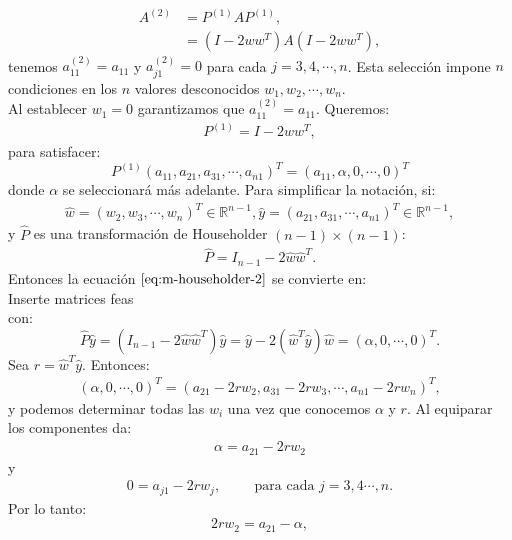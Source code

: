 \begin{align*}
  A^{(2)}&=P^{(1)}AP^{(1)},\\
  &=(I-2ww^T)A(I-2ww^T),
\end{align*}
tenemos $a_{11}^{(2)}=a_{11}$ y $a_{j1}^{(2)}=0$ para cada $j=3,4,\cdots,n$. Esta selección impone $n$ condiciones en los $n$ valores desconocidos $w_1,w_2,\cdots,w_n$.\\
Al establecer $w_1=0$ garantizamos que $a_{11}^{(2)}=a_{11}$. Queremos:
\begin{align*}
  P^{(1)}=I-2ww^T,
\end{align*}
para satisfacer:
\begin{equation}\label{eq:m-householder-2}
  P^{(1)}(a_{11},a_{21},a_{31},\cdots,a_{n1})^{T}=(a_{11},\alpha,0,\cdots,0)^T
\end{equation}
donde $\alpha$ se seleccionará más adelante. Para simplificar la notación, si:
\begin{align*}
  \hat{w}=(w_2,w_3,\cdots,w_n)^{T}\in\mathbb{R}^{n-1}, \hat{y}=(a_{21},a_{31},\cdots,a_{n1})^{T}\in\mathbb{R}^{n-1},  
\end{align*}
y $\hat{P}$ es una transformación de Householder $(n-1)\times(n-1)$:
\begin{align*}
  \hat{P}=I_{n-1}-2\hat{w}\hat{w}^T.
\end{align*}
Entonces la ecuación $\ref{eq:m-householder-2}$ se convierte en:\\
Inserte matrices feas\\ 
con:
\begin{equation}\label{eq:m-householder-9.10}
  \hat{P}\hat{y}=(I_{n-1}-2\hat{w}\hat{w}^T)\hat{y}=\hat{y}-2(\hat{w}^T\hat{y})\hat{w}=(\alpha,0,\cdots,0)^T.
\end{equation}
Sea $r=\hat{w}^T\hat{y}$. Entonces:
\begin{align*}
  (\alpha,0,\cdots,0)^{T}=(a_{21}-2rw_2,a_{31}-2rw_3,\cdots,a_{n1}-2rw_n)^T,
\end{align*}
y podemos determinar todas las $w_i$ una vez que conocemos $\alpha$ y $r$. Al equiparar los componentes da:
\begin{align*}
  \alpha=a_{21}-2rw_2
\end{align*}
y
\begin{align*}
  0=a_{j1}-2rw_j, \hspace{1cm}\text{para cada }j=3,4\cdots,n.
\end{align*}
Por lo tanto:
\begin{equation}\label{eq:m-householder-3}
  2rw_2=a_{21}-\alpha,
\end{equation}
